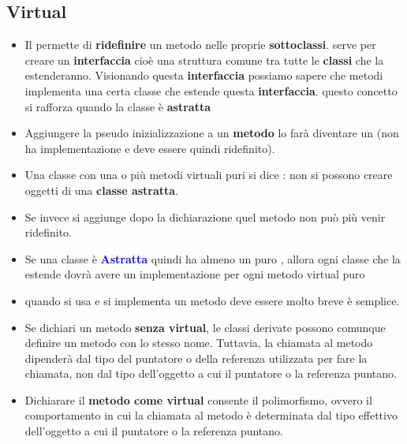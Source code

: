 \subsection{Virtual}
\begin{itemize}
    \item Il \textcolor{blue}{} permette di \textbf{ridefinire} un metodo nelle proprie \textbf{sottoclassi}. \textcolor{blue}{} serve per creare un \textbf{interfaccia} cioè una struttura comune tra tutte le \textbf{classi} che la estenderanno. Visionando questa \textbf{interfaccia} possiamo sapere che metodi implementa una certa classe che estende questa \textbf{interfaccia}. questo concetto si rafforza quando la classe è \textbf{astratta}
    \item Aggiungere la pseudo inizializzazione \textcolor{blue}{} a un \textbf{metodo} lo farà diventare un  \textcolor{blue}{} (non ha implementazione e deve essere quindi ridefinito).
    \item Una classe con una o più metodi virtuali puri si dice
    \textcolor{blue}{}: non si possono creare oggetti di una \textbf{classe astratta}.
    \item  Se invece si aggiunge \textcolor{blue}{} dopo la dichiarazione quel
    metodo non può più venir ridefinito.
    \item Se una classe è \textbf{\textcolor{blue}{Astratta}} quindi ha almeno un  puro , allora ogni classe che la estende dovrà avere un implementazione per ogni metodo virtual puro
    
    \item quando si usa \textcolor{blue}{} e si implementa un metodo deve essere molto breve è semplice.
    \item Se dichiari un metodo \textbf{senza virtual}, le classi derivate possono comunque definire un metodo con lo stesso nome. Tuttavia, la chiamata al metodo dipenderà dal tipo del puntatore o della referenza utilizzata per fare la chiamata, non dal tipo dell'oggetto a cui il puntatore o la referenza puntano.
    \item Dichiarare il \textbf{metodo come virtual} consente il polimorfismo, ovvero il comportamento in cui la chiamata al metodo è determinata dal tipo effettivo dell'oggetto a cui il puntatore o la referenza puntano.
    
\end{itemize}
\newpage
